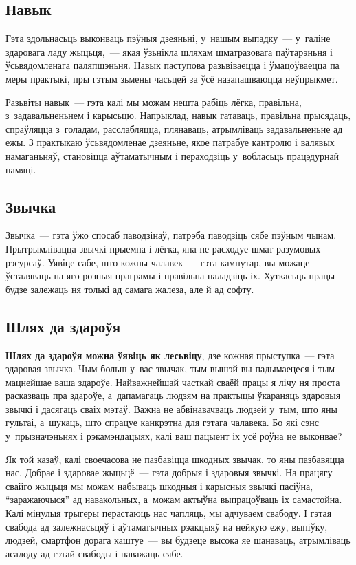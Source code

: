 \subsection*{Навык}

Гэта здольнасьць выконваць пэўныя дзеяньні, у~нашым выпадку~--- у~галіне здаровага ладу жыцьця,~--- якая ўзьнікла шляхам шматразовага паўтарэньня і ўсьвядомленага паляпшэньня. Навык паступова разьвіваецца і ўмацоўваецца па меры практыкі, пры гэтым зьмены часьцей за ўсё назапашваюцца неўпрыкмет.

Разьвіты навык~--- гэта калі мы можам нешта рабіць лёгка, правільна, з~задавальненьнем і карысьцю. Напрыклад, навык гатаваць, правільна прысядаць, спраўляцца з~голадам, расслабляцца, плянаваць, атрымліваць задавальненьне ад ежы. З практыкаю ўсьвядомленае дзеяньне, якое патрабуе кантролю і валявых намаганьняў, становіцца аўтаматычным і пераходзіць у~вобласьць працэдурнай памяці.

\subsection*{Звычка}

Звычка~--- гэта ўжо спосаб паводзінаў, патрэба паводзіць сябе пэўным чынам. Прытрымлівацца звычкі прыемна і лёгка, яна не расходуе шмат разумовых рэсурсаў. Уявіце сабе, што кожны чалавек~--- гэта кампутар, вы можаце ўсталяваць на яго розныя праграмы і правільна наладзіць іх. Хуткасьць працы будзе залежаць ня толькі ад самага жалеза, але й ад софту.

\subsection*{Шлях да здароўя}

\textbf{Шлях да здароўя можна ўявіць як лесьвіцу}, дзе кожная прыступка~--- гэта здаровая звычка. Чым больш у~вас звычак, тым вышэй вы падымаецеся і тым мацнейшае ваша здароўе. Найважнейшай часткай сваёй працы я лічу ня проста расказваць пра здароўе, а~дапамагаць людзям на практыцы ўкараняць здаровыя звычкі і дасягаць сваіх мэтаў. Важна не абвінавачваць людзей у~тым, што яны гультаі, а~шукаць, што спрацуе канкрэтна для гэтага чалавека. Бо які сэнс у~прызначэньнях і рэкамэндацыях, калі ваш пацыент іх усё роўна не выконвае?

Як той казаў, калі своечасова не пазбавіцца шкодных звычак, то яны пазбавяцца нас. Добрае і здаровае жыцьцё~--- гэта добрыя і здаровыя звычкі. На працягу свайго жыцьця мы можам набываць шкодныя і карысныя звычкі пасіўна, ``заражаючыся'' ад навакольных, а~можам актыўна выпрацоўваць іх самастойна. Калі мінулыя трыгеры перастаюць нас чапляць, мы адчуваем свабоду. І гэтая свабода ад залежнасьцяў і аўтаматычных рэакцыяў на нейкую ежу, выпіўку, людзей, смартфон дорага каштуе~--- вы будзеце высока яе шанаваць, атрымліваць асалоду ад гэтай свабоды і паважаць сябе.

